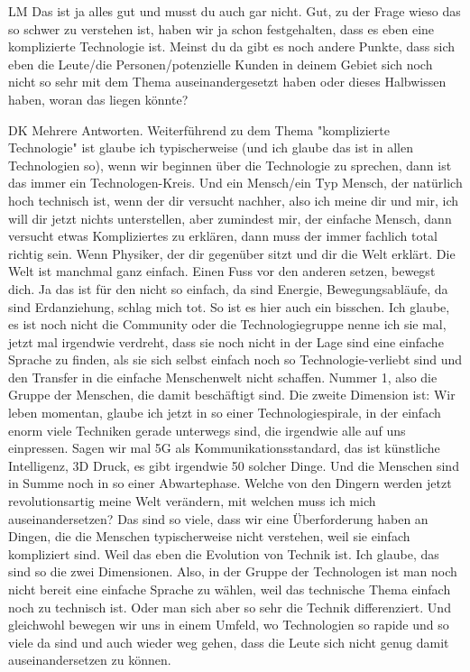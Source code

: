 \begin{xlist}
     \item[LM] Das ist ja alles gut und musst du auch gar nicht. Gut, zu der Frage wieso das so schwer zu verstehen ist, haben wir ja schon festgehalten, dass es eben eine komplizierte Technologie ist. Meinst du da gibt es noch andere Punkte, dass sich eben die Leute/die Personen/potenzielle Kunden in deinem Gebiet sich noch nicht so sehr mit dem Thema auseinandergesetzt haben oder dieses Halbwissen haben, woran das liegen könnte?
     \item[DK] Mehrere Antworten. Weiterführend zu dem Thema "komplizierte Technologie" ist glaube ich typischerweise  (und ich glaube das ist in allen Technologien so), wenn wir  beginnen über die Technologie zu sprechen, dann ist das immer ein Technologen-Kreis. Und ein Mensch/ein Typ Mensch, der natürlich hoch technisch ist, wenn der dir versucht nachher, also ich meine dir und mir, ich will dir jetzt nichts unterstellen, aber zumindest mir, der einfache Mensch, dann versucht etwas Kompliziertes zu erklären, dann muss der immer fachlich total richtig sein. Wenn Physiker, der dir gegenüber sitzt und dir die Welt erklärt. Die Welt ist manchmal ganz einfach. Einen Fuss vor den anderen setzen, bewegst dich. Ja das ist für den nicht so einfach, da sind Energie, Bewegungsabläufe, da sind Erdanziehung, schlag mich tot. So ist es hier auch ein bisschen. Ich glaube, es ist noch nicht die Community oder die Technologiegruppe nenne ich sie mal, jetzt mal irgendwie verdreht, dass sie noch nicht in der Lage sind eine einfache Sprache zu finden, als sie sich selbst einfach noch so Technologie-verliebt sind und den Transfer in die einfache Menschenwelt nicht schaffen. Nummer 1, also die Gruppe der Menschen, die damit beschäftigt sind. Die zweite Dimension ist: Wir leben momentan, glaube ich jetzt in so einer Technologiespirale, in der einfach enorm viele Techniken gerade unterwegs sind, die irgendwie alle auf uns einpressen. Sagen wir mal 5G als Kommunikationsstandard, das ist künstliche Intelligenz, 3D Druck, es gibt irgendwie 50 solcher Dinge. Und die Menschen sind in Summe noch in so einer Abwartephase. Welche von den Dingern werden jetzt revolutionsartig meine Welt verändern, mit welchen muss ich mich auseinandersetzen? Das sind so viele, dass wir eine Überforderung haben an Dingen, die die Menschen typischerweise nicht verstehen, weil sie einfach kompliziert sind. Weil das eben die Evolution von Technik ist. Ich glaube, das sind so die zwei Dimensionen. Also, in der Gruppe der Technologen ist man noch nicht bereit eine einfache Sprache zu wählen, weil das technische Thema einfach noch zu technisch ist. Oder man sich aber so sehr die Technik differenziert. Und gleichwohl bewegen wir uns in einem Umfeld, wo Technologien so rapide und so viele da sind und auch wieder weg gehen, dass die Leute sich nicht genug damit auseinandersetzen zu können.

\end{xlist}
